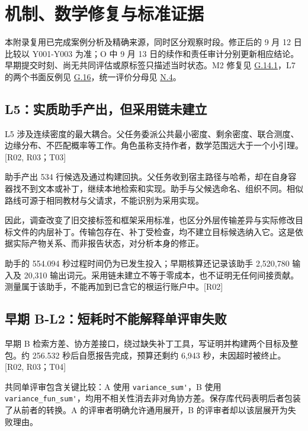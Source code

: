 \section[机制、数学修复与标准证据]{\texorpdfstring{\protect\hypertarget{appendix-g}{}机制、数学修复与标准证据}{机制、数学修复与标准证据}}
本附录复用已完成案例分析及精确来源，同时区分观察时段。修正后的 9 月 12 日比较以 Y001-Y003 为准；O 中 9 月 13 日的续作和责任审计分别更新相应结论。早期提交时刻、尚无共同评估或原标签只描述当时状态。M2 修复见 \hyperlink{g14-1}{G.14.1}，L7 的两个书面反例见 \hyperlink{g16}{G.16}，统一评价分母见 \hyperlink{n4}{N.4}。

\subsection[L5：实质助手产出，但采用链未建立]{\texorpdfstring{\protect\hypertarget{g1}{}L5：实质助手产出，但采用链未建立}{L5：实质助手产出，但采用链未建立}}
L5 涉及连续密度的最大耦合。父任务委派公共最小密度、剩余密度、联合测度、边缘分布、不匹配概率等工作。角色虽称支持作者，数学范围远大于一个小引理。[R02, R03；T03]

助手产出 534 行候选及通过构建回执。父任务收到宿主路径与哈希，却在自身容器找不到文本或补丁，继续本地检索和实现。助手与父候选命名、组织不同。相似路线可源于相同教材与父请求，不能识别为采用实现。

因此，调查改变了旧交接标签和框架采用标准，也区分外层传输差异与实际修改目标文件的内层补丁。传输包存在、补丁受检查，均不建立目标候选纳入它。这是依据实际产物关系、而非报告状态，对分析本身的修正。

助手的 554.094 秒过程时间仍为已发生投入；早期核算还记录该助手 2,520,780 输入及 20,310 输出词元。采用链未建立不等于零成本，也不证明无任何间接贡献。测量属于该助手，不能再加到已含它的根运行账户中。[R02]

\subsection[早期 B-L2：短耗时不能解释单评审失败]{\texorpdfstring{\protect\hypertarget{g2}{}早期 B-L2：短耗时不能解释单评审失败}{早期 B-L2：短耗时不能解释单评审失败}}
早期 B 检索方差、协方差接口，绕过缺失补丁工具，写证明并构建两个目标及整包。约 256.532 秒后自愿报告完成，预算还剩约 6,943 秒，未因超时被终止。[R02, R03；T04]

共同单评审包含关键比较：A 使用 \nolinkurl{variance_sum'}，B 使用 \nolinkurl{variance_fun_sum'}，均用不相关性消去非对角协方差。保存库代码表明后者包装了从前者的转换。A 的评审者明确允许通用展开，B 的评审者却以该层展开为失败理由。

